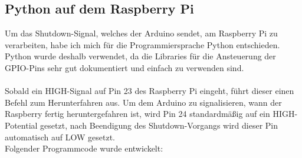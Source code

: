 \subsection{Python auf dem Raspberry Pi}

Um das Shutdown-Signal, welches der Arduino sendet, am Raspberry Pi zu verarbeiten, habe ich mich für die Programmiersprache Python entschieden. Python wurde deshalb verwendet, da die Libraries für die Ansteuerung der GPIO-Pins sehr gut dokumentiert und einfach zu verwenden sind.\\
\\
Sobald ein HIGH-Signal auf Pin 23 des Raspberry Pi eingeht, führt dieser einen Befehl zum Herunterfahren aus. Um dem Arduino zu signalisieren, wann der Raspberry fertig heruntergefahren ist, wird Pin 24 standardmäßig auf ein HIGH-Potential gesetzt, nach Beendigung des Shutdown-Vorgangs wird dieser Pin automatisch auf LOW gesetzt.
\\
Folgender Programmcode wurde entwickelt:

